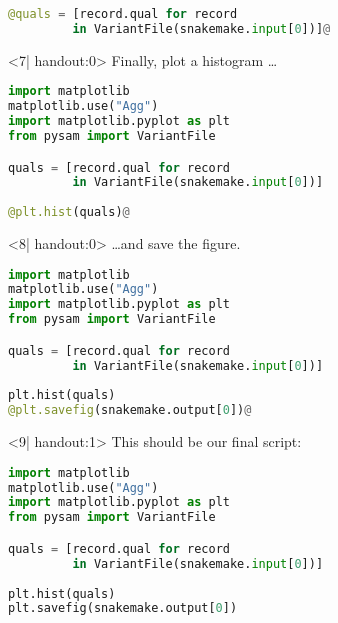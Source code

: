 \begin{frame}[fragile]
\begin{onlyenv}
\begin{lstlisting}[language=Python,style=Python]
@quals = [record.qual for record 
         in VariantFile(snakemake.input[0])]@
   \end{lstlisting}
  \end{onlyenv}
  \begin{onlyenv}<7| handout:0>
   Finally, plot a histogram \ldots
   \begin{lstlisting}[language=Python,style=Python]
import matplotlib
matplotlib.use("Agg")
import matplotlib.pyplot as plt
from pysam import VariantFile

quals = [record.qual for record 
         in VariantFile(snakemake.input[0])]
         
@plt.hist(quals)@
   \end{lstlisting}
  \end{onlyenv}
  \begin{onlyenv}<8| handout:0>
   \ldots and save the figure.
   \begin{lstlisting}[language=Python,style=Python]
import matplotlib
matplotlib.use("Agg")
import matplotlib.pyplot as plt
from pysam import VariantFile

quals = [record.qual for record 
         in VariantFile(snakemake.input[0])]
         
plt.hist(quals)
@plt.savefig(snakemake.output[0])@
   \end{lstlisting}
  \end{onlyenv}
  \begin{onlyenv}<9| handout:1>
   This should be our final script:
   \begin{lstlisting}[language=Python,style=Python]
import matplotlib
matplotlib.use("Agg")
import matplotlib.pyplot as plt
from pysam import VariantFile

quals = [record.qual for record 
         in VariantFile(snakemake.input[0])]
         
plt.hist(quals)
plt.savefig(snakemake.output[0])
   \end{lstlisting}
  \end{onlyenv}
\end{frame}





